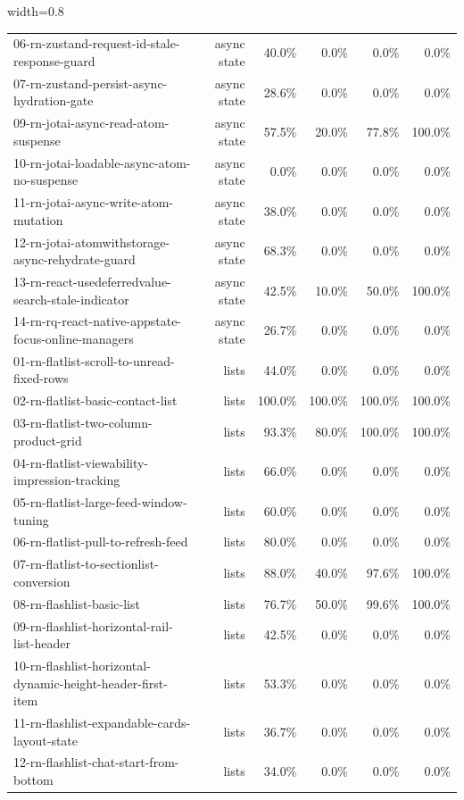\begin{table}[htbp]
\begin{adjustbox}{width=0.8\textwidth}
\begin{tabular}{lrrrrr}
06-rn-zustand-request-id-stale-response-guard & async state & 40.0\% & 0.0\% & 0.0\% & 0.0\% \\
07-rn-zustand-persist-async-hydration-gate & async state & 28.6\% & 0.0\% & 0.0\% & 0.0\% \\
09-rn-jotai-async-read-atom-suspense & async state & 57.5\% & 20.0\% & 77.8\% & 100.0\% \\
10-rn-jotai-loadable-async-atom-no-suspense & async state & 0.0\% & 0.0\% & 0.0\% & 0.0\% \\
11-rn-jotai-async-write-atom-mutation & async state & 38.0\% & 0.0\% & 0.0\% & 0.0\% \\
12-rn-jotai-atomwithstorage-async-rehydrate-guard & async state & 68.3\% & 0.0\% & 0.0\% & 0.0\% \\
13-rn-react-usedeferredvalue-search-stale-indicator & async state & 42.5\% & 10.0\% & 50.0\% & 100.0\% \\
14-rn-rq-react-native-appstate-focus-online-managers & async state & 26.7\% & 0.0\% & 0.0\% & 0.0\% \\
01-rn-flatlist-scroll-to-unread-fixed-rows & lists & 44.0\% & 0.0\% & 0.0\% & 0.0\% \\
02-rn-flatlist-basic-contact-list & lists & 100.0\% & 100.0\% & 100.0\% & 100.0\% \\
03-rn-flatlist-two-column-product-grid & lists & 93.3\% & 80.0\% & 100.0\% & 100.0\% \\
04-rn-flatlist-viewability-impression-tracking & lists & 66.0\% & 0.0\% & 0.0\% & 0.0\% \\
05-rn-flatlist-large-feed-window-tuning & lists & 60.0\% & 0.0\% & 0.0\% & 0.0\% \\
06-rn-flatlist-pull-to-refresh-feed & lists & 80.0\% & 0.0\% & 0.0\% & 0.0\% \\
07-rn-flatlist-to-sectionlist-conversion & lists & 88.0\% & 40.0\% & 97.6\% & 100.0\% \\
08-rn-flashlist-basic-list & lists & 76.7\% & 50.0\% & 99.6\% & 100.0\% \\
09-rn-flashlist-horizontal-rail-list-header & lists & 42.5\% & 0.0\% & 0.0\% & 0.0\% \\
10-rn-flashlist-horizontal-dynamic-height-header-first-item & lists & 53.3\% & 0.0\% & 0.0\% & 0.0\% \\
11-rn-flashlist-expandable-cards-layout-state & lists & 36.7\% & 0.0\% & 0.0\% & 0.0\% \\
12-rn-flashlist-chat-start-from-bottom & lists & 34.0\% & 0.0\% & 0.0\% & 0.0\% \\

\end{tabular}
\end{adjustbox}
\end{table}
